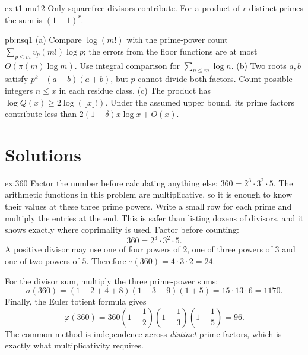 \begin{hint}{ex:t1-mu12}
Only squarefree divisors contribute. For a product of $r$ distinct primes the sum is $(1-1)^r$.
\end{hint}

\begin{hint}{pb:nsq1}
(a) Compare $\log(m!)$ with the prime-power count
$\sum_{p\le m}v_p(m!)\log p$; the errors from the
floor functions are at most $O(\pi(m)\log m)$.
Use integral comparison for $\sum_{n\le m}\log n$.
(b) Two roots $a,b$ satisfy $p^k\mid(a-b)(a+b)$,
but $p$ cannot divide both factors. Count possible
integers $n\le x$ in each residue class.
(c) The product has $\log Q(x)\ge2\log(\lfloor x\rfloor!)$.
Under the assumed upper bound, its prime factors
contribute less than $2(1-\delta)x\log x+O(x)$.
\end{hint}

\section{Solutions}

\begin{solution}{ex:360}
\idea Factor the number before calculating anything else: $360=2^3\cdot3^2\cdot5$. The arithmetic functions in this problem are multiplicative, so it is enough to know their values at these three prime powers. Write a small row for each prime and multiply the entries at the end. This is safer than listing dozens of divisors, and it shows exactly where coprimality is used.
\writeup Factor before counting:
\[
360=2^3\cdot3^2\cdot5.
\]
A positive divisor may use one of four powers of $2$, one of three powers of $3$ and one of two powers of $5$. Therefore $\tau(360)=4\cdot3\cdot2=24$.

For the divisor sum, multiply the three prime-power sums:
\[
\sigma(360)=(1+2+4+8)(1+3+9)(1+5)
=15\cdot13\cdot6=1170.
\]
Finally, the Euler totient formula gives
\[
\varphi(360)
=360\left(1-\frac12\right)\left(1-\frac13\right)
\left(1-\frac15\right)=96.
\]
The common method is independence across \emph{distinct} prime factors, which is exactly what multiplicativity requires.
\end{solution}


